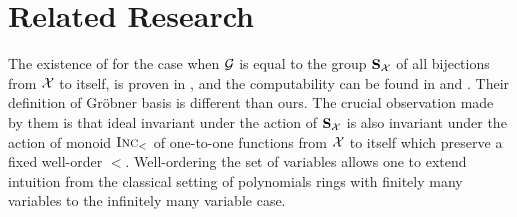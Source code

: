 \section{Related Research}
%
The existence of  for the case when $\mathcal{G}$ is equal to the group $\mathbf{S}_{\mathcal{X}}$ of all bijections from $\mathcal{X}$ to itself,
is proven in \cite[Proposition 2]{COHEN67},
and the computability can be found in \cite[Theorem 10]{COHEN87} and \cite{Emmott87}.
Their definition of Gr\"{o}bner basis is different than ours.
The crucial observation made by them is that ideal invariant under the action of $\mathbf{S}_{\mathcal{X}}$ is also invariant under the action of monoid $\textsc{Inc}_{<}$ of one-to-one functions from $\mathcal{X}$ to itself which preserve a fixed well-order $<$.
Well-ordering the set of variables allows one to extend intuition from the classical setting of polynomials rings with finitely many variables to the infinitely many variable case.


